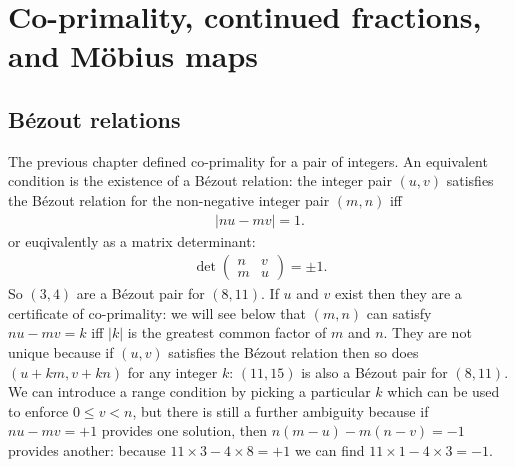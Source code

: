 
		
\chapter{Co-primality, continued fractions, and M\"obius maps}


\section{B\'ezout relations}
The previous chapter defined co-primality for a pair of integers. An equivalent condition is the existence of a  B\'ezout relation: the integer pair $(u,v)$ satisfies the B\'ezout relation for the non-negative integer pair $(m,n)$ iff
\begin{align}
	|n  u-mv| = 1.
\end{align}
or euqivalently as a matrix determinant:
\begin{align}
	\det \begin{pmatrix} n& v \\ m & u \end{pmatrix} = \pm 1.
\end{align}
So $(3,4)$ are a B\'ezout pair for $(8,11)$. 
If $u$ and $v$ exist then they are a certificate of co-primality: we will see below that $(m,n)$ can satisfy  $ n  u - m v= k$ iff $|k|$ is the greatest common factor of $m$ and $n$. They are not unique because if $(u,v)$ satisfies the B\'ezout relation then so does $(u+km,v+kn)$ for any integer $k$: $(11,15)$ is also a B\'ezout pair for $(8,11)$. We can introduce a range condition by picking a particular $k$ which can be used to enforce $0\leq v< n$, but there is still a further ambiguity because if
$n u- m v  =+1$ provides one solution, then $n(m-u)-m(n-v)=-1$ provides another: because $11\times3-4\times8 =+1$ we can find $11\times 1-4\times 3=-1$. 

